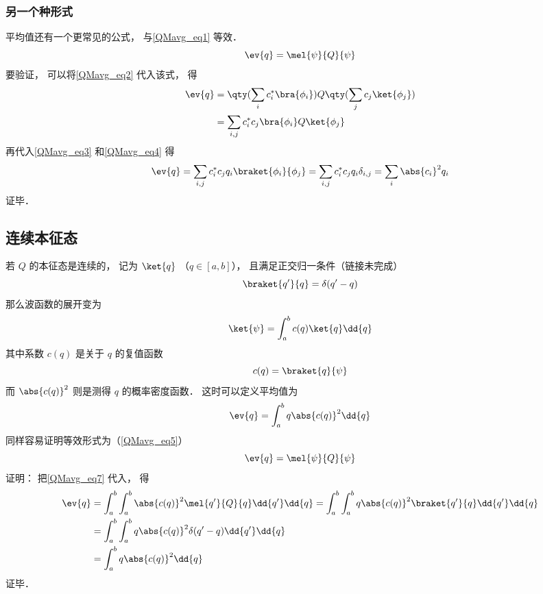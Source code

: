 \subsubsection{另一个种形式}
平均值还有一个更常见的公式， 与\autoref{QMavg_eq1} 等效．
\begin{equation}\label{QMavg_eq5}
\ev{q} = \mel{\psi}{Q}{\psi}
\end{equation}
要验证， 可以将\autoref{QMavg_eq2} 代入该式， 得
\begin{equation}
\begin{aligned}
\ev{q} &= \qty(\sum_i c_i^* \bra{\phi_i}) Q \qty(\sum_j c_j \ket{\phi_j})\\
&= \sum_{i,j} c_i^* c_j \bra{\phi_i} Q \ket{\phi_j}
\end{aligned} 
\end{equation}
再代入\autoref{QMavg_eq3} 和\autoref{QMavg_eq4} 得
\begin{equation}
\ev{q} = \sum_{i,j} c_i^* c_j q_i \braket{\phi_i}{\phi_j}
= \sum_{i,j} c_i^* c_j q_i \delta_{i,j} = \sum_i \abs{c_i}^2 q_i
\end{equation}
证毕．

\subsection{连续本征态}

若 $Q$ 的本征态是连续的， 记为 $\ket{q}$ （$q\in [a,b]$）， 且满足正交归一条件（链接未完成）
\begin{equation}
\braket{q'}{q} = \delta(q'-q)
\end{equation}
那么波函数的展开变为
\begin{equation}\label{QMavg_eq7}
\ket{\psi} = \int_a^b c(q) \ket{q} \dd{q}
\end{equation}
其中系数 $c(q)$ 是关于 $q$ 的复值函数
\begin{equation}
c(q) = \braket{q}{\psi}
\end{equation}
而 $\abs{c(q)}^2$ 则是测得 $q$ 的概率密度函数． 这时可以定义平均值为
\begin{equation}
\ev{q} = \int_a^b q \abs{c(q)}^2 \dd{q}
\end{equation}
同样容易证明等效形式为（\autoref{QMavg_eq5}）
\begin{equation}
\ev{q} = \mel{\psi}{Q}{\psi}
\end{equation}
证明： 把\autoref{QMavg_eq7} 代入， 得
\begin{equation}
\begin{aligned}
\ev{q} &= \int_a^b\int_a^b \abs{c(q)}^2\mel{q'}{Q}{q} \dd{q'}\dd{q} = \int_a^b\int_a^b q\abs{c(q)}^2\braket{q'}{q} \dd{q'}\dd{q}\\
&= \int_a^b\int_a^b q\abs{c(q)}^2\delta(q'-q) \dd{q'}\dd{q}\\
&= \int_a^b q\abs{c(q)}^2 \dd{q}
\end{aligned}
\end{equation}
证毕．

